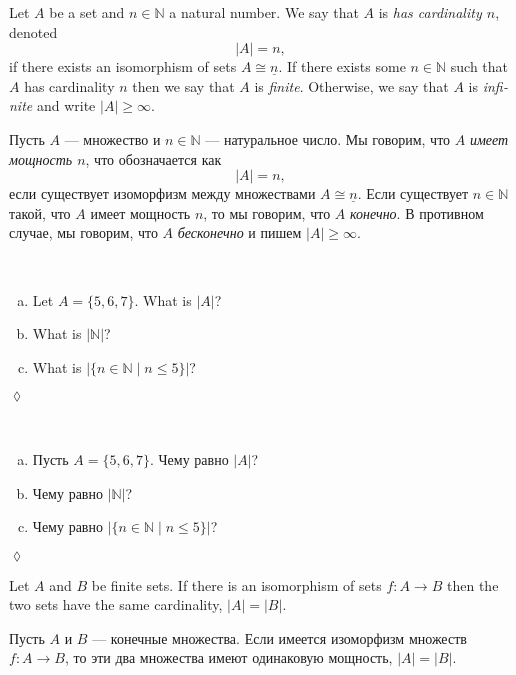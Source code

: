 \documentclass[a4paper]{book}
\def\NN{{\mathbb N}}
\def\to{\rightarrow}
\def\taking{\colon}
\def\iso{\cong}
\def\|{{\;|\;}}
\def\ul{\underline}
\theoremstyle{myth}
\newtheorem{lemmaENG}[envENG]{\begin{english}Lemma\end{english}}
\newtheorem{excENG}[envENG]{\begin{english}Exercise\end{english}}
\newtheorem{definitionENG}[envENG]{\begin{english}Definition\end{english}}
\newenvironment{exerciseENG}{\begin{excENG}}{\hspace*{\fill}$\lozenge$\end{excENG}}
\newtheorem{lemmaRUS}[envRUS]{\begin{russian}Лемма\end{russian}}
\newtheorem{excRUS}[envRUS]{\begin{russian}Упражнение\end{russian}}
\newtheorem{definitionRUS}[envRUS]{\begin{russian}Определение\end{russian}}
\newenvironment{exerciseRUS}{\begin{excRUS}}{\hspace*{\fill}$\lozenge$\end{excRUS}}
\def\sexc{\begin{enumerate}[a.)]\setlength{\itemsep}{.1cm}\setlength{\parskip}{.1cm}\item}
\def\next{\item}
\def\endsexc{\end{enumerate}}
\begin{document}
\begin{english}
\begin{definitionENG}\label{def:cardinality}
Let $A$ be a set and $n\in\NN$ a natural number. We say that $A$ is {\em has cardinality $n$}, denoted $$|A|=n,$$ if there exists an isomorphism of sets $A\iso\ul{n}$. If there exists some $n\in\NN$ such that $A$ has cardinality $n$ then we say that $A$ is {\em finite}. Otherwise, we say that $A$ is {\em infinite} and write $|A|\geq\infty$.
\end{definitionENG}

\begin{definitionRUS}\label{def:cardinality}
\begin{russian}
Пусть $A$ — множество и $n\in\NN$ — натуральное число. Мы говорим, что $A$ {\em имеет мощность $n$}, что обозначается как $$|A|=n,$$ если существует изоморфизм между множествами $A\iso\ul{n}$. Если существует $n\in\NN$ такой, что $A$ имеет мощность $n$, то мы говорим, что $A$ {\em конечно}. В противном случае, мы говорим, что $A$ {\em бесконечно} и пишем $|A|\geq\infty$.
\end{russian}
\end{definitionRUS}

\begin{exerciseENG}~
\sexc Let $A=\{5,6,7\}$. What is $|A|$? 
\next What is $|\NN|$? 
\next What is $|\{n\in\NN\|n\leq 5\}|$?
\endsexc
\end{exerciseENG}

\begin{exerciseRUS}~
\begin{russian}
\sexc Пусть $A=\{5,6,7\}$. Чему равно $|A|$? 
\next Чему равно $|\NN|$? 
\next Чему равно $|\{n\in\NN\|n\leq 5\}|$?
\endsexc
\end{russian}
\end{exerciseRUS}

\begin{lemmaENG}
Let $A$ and $B$ be finite sets. If there is an isomorphism of sets $f\taking A\to B$ then the two sets have the same cardinality, $|A|=|B|$.
\end{lemmaENG}

\begin{lemmaRUS}
\begin{russian}Пусть $A$ и $B$ — конечные множества. Если имеется изоморфизм множеств $f\taking A\to B$, то эти два множества имеют одинаковую мощность, $|A|=|B|$. \end{russian}
\end{lemmaRUS}


\end{english}
\end{document}
